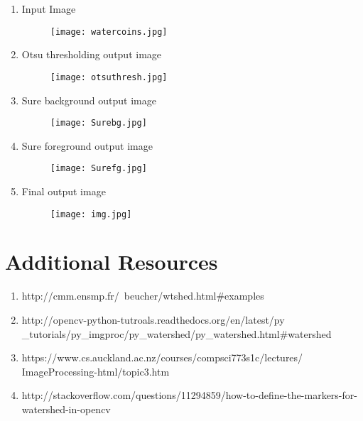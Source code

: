\documentclass[]{article}
\providecommand{\tightlist}{%
  \setlength{\itemsep}{0pt}\setlength{\parskip}{0pt}}
\begin{document}
\begin{enumerate}
\def\labelenumi{\arabic{enumi})}
\item Input Image\\
   \begin{figure}[h]
   	\texttt{[image: watercoins.jpg]}
   \end{figure}
\newpage
\item Otsu thresholding output image\\
\begin{figure}[h]
	\texttt{[image: otsuthresh.jpg]}
\end{figure}
\newpage
\item Sure background output image\\
  \begin{figure}[h]
  	\texttt{[image: Surebg.jpg]}
  \end{figure}
\newpage
\item Sure foreground output image\\
  \begin{figure}[h]
	\texttt{[image: Surefg.jpg]}
  \end{figure}

\newpage   
\item
  Final output image\\
  \begin{figure}[h]
  	\texttt{[image: img.jpg]}
  \end{figure}
  
\end{enumerate}
\newpage
\section{Additional Resources}\label{additional-resources}

\begin{enumerate}
\def\labelenumi{\arabic{enumi})}
\tightlist
\item http://cmm.ensmp.fr/~beucher/wtshed.html\#examples
\item http://opencv-python-tutroals.readthedocs.org/en/latest/py
\_tutorials/py\_imgproc/py\_watershed/py\_watershed.html\#watershed
\item https://www.cs.auckland.ac.nz/courses/compsci773s1c/lectures/
ImageProcessing-html/topic3.htm
\item http://stackoverflow.com/questions/11294859/how-to-define-the-markers-for-watershed-in-opencv
\end{enumerate}
\end{document}

